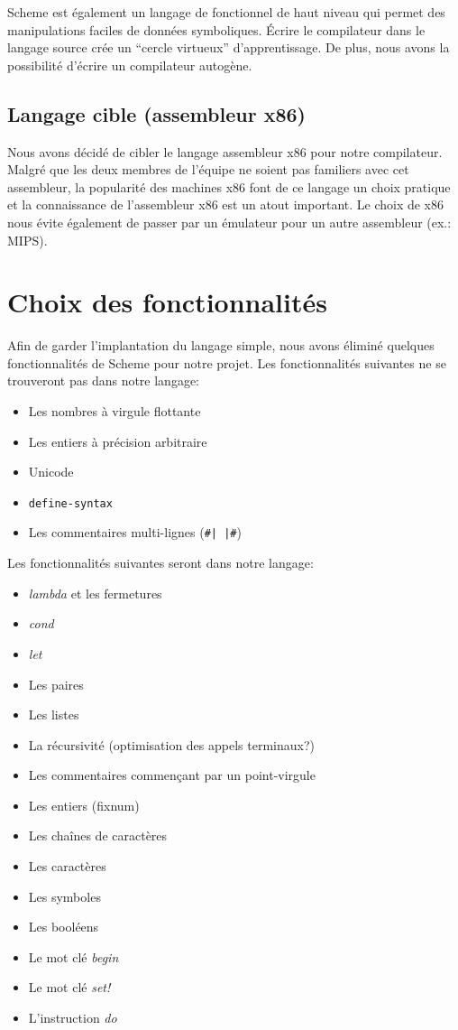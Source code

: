 \documentclass[11pt]{article}
\begin{document}
Scheme est également un langage de fonctionnel de haut niveau qui
permet des manipulations faciles de données symboliques.  Écrire le
compilateur dans le langage source crée un ``cercle virtueux''
d'apprentissage.  De plus, nous avons la possibilité d'écrire un
compilateur autogène.


\subsection{Langage cible (assembleur x86)}

Nous avons décidé de cibler le langage assembleur x86 pour notre
compilateur.  Malgré que les deux membres de l'équipe ne soient pas
familiers avec cet assembleur, la popularité des machines x86 font de
ce langage un choix pratique et la connaissance de l'assembleur x86
est un atout important.  Le choix de x86 nous évite également de
passer par un émulateur pour un autre assembleur (ex.: MIPS).


\section{Choix des fonctionnalités}

Afin de garder l'implantation du langage simple, nous avons éliminé
quelques fonctionnalités de Scheme pour notre projet.  Les
fonctionnalités suivantes ne se trouveront pas dans notre langage:


\begin{itemize}
\item Les nombres à virgule flottante
\item Les entiers à précision arbitraire
\item Unicode
\item \texttt{define-syntax}
\item Les commentaires multi-lignes (\texttt{\#| |\#})
\end{itemize}

Les fonctionnalités suivantes seront dans notre langage:


\begin{itemize}
\item \emph{lambda} et les fermetures
\item \emph{cond}
\item \emph{let}
\item Les paires
\item Les listes
\item La récursivité (optimisation des appels terminaux?)
\item Les commentaires commençant par un point-virgule
\item Les entiers (fixnum)
\item Les chaînes de caractères
\item Les caractères
\item Les symboles
\item Les booléens
\item Le mot clé \emph{begin}
\item Le mot clé \emph{set!}
\item L'instruction \emph{do}
\end{itemize}
\end{document}
